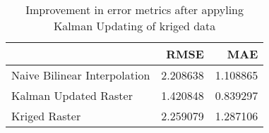 \begin{table}[ht]
\caption{Improvement in error metrics after appyling Kalman Updating of kriged data}
\label{tab:florida_keys_lidar_error}
\begin{tabular}{lrr}
\toprule
 & RMSE & MAE \\
\midrule
Naive Bilinear Interpolation & 2.208638 & 1.108865 \\
Kalman Updated Raster & 1.420848 & 0.839297 \\
Kriged Raster & 2.259079 & 1.287106 \\
\bottomrule
\end{tabular}
\end{table}
